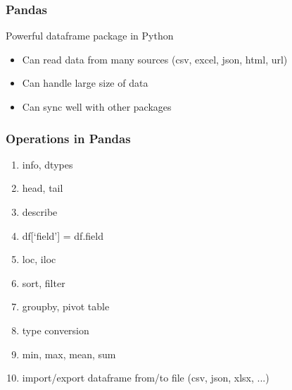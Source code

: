 \documentclass{beamer}
\begin{document}

\begin{frame}
    \frametitle{Pandas}
    Powerful dataframe package in Python
        \begin{itemize}
            \item Can read data from many sources (csv, excel, json, html, url)
            \item Can handle large size of data
            \item Can sync well with other packages
        \end{itemize}
\end{frame}

\begin{frame}
    \frametitle{Operations in Pandas}
    \begin{enumerate}
        \item info, dtypes 
        \item head, tail 
        \item describe
        \item df[‘field’] = df.field
        \item loc, iloc
        \item sort, filter
        \item groupby, pivot table
        \item type conversion
        \item min, max, mean, sum
        \item import/export dataframe from/to file (csv, json, xlsx, ...)
    \end{enumerate}
\end{frame}

\end{document}
